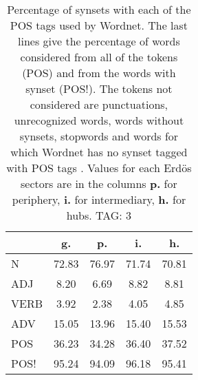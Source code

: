 \begin{table}[h!]
\begin{center}
\begin{tabular}{| l || c | c | c | c |}\hline
 & {\bf g.} & {\bf p.} & {\bf i.} & {\bf h.} \\\hline\hline
N & 72.83  & 76.97  & 71.74  & 70.81 \\\hline
ADJ & 8.20  & 6.69  & 8.82  & 8.81 \\\hline
VERB & 3.92  & 2.38  & 4.05  & 4.85 \\\hline
ADV & 15.05  & 13.96  & 15.40  & 15.53 \\\hline\hline
POS & 36.23  & 34.28  & 36.40  & 37.52 \\\hline
POS! & 95.24  & 94.09  & 96.18  & 95.41 \\\hline
\end{tabular}
\caption{Percentage of synsets with each of the POS tags used by Wordnet. The last lines give the percentage of words considered from all of the tokens (POS) and from the words with synset (POS!). The tokens not considered are punctuations, unrecognized words, words without synsets, stopwords and words for which Wordnet has no synset  tagged with POS tags . Values for each Erd\"os sectors are in the columns {{\bf p.}} for periphery, {{\bf i.}} for intermediary, {{\bf h.}} for hubs. TAG: 3}
\end{center}
\end{table}